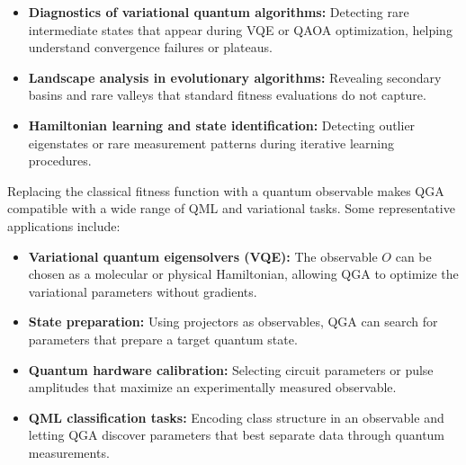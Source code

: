 \documentclass{article}
\begin{document}
\begin{itemize}
    \item \textbf{Diagnostics of variational quantum algorithms:}
    Detecting rare intermediate states that appear during VQE or QAOA optimization, helping understand convergence failures or plateaus.

    \item \textbf{Landscape analysis in evolutionary algorithms:} Revealing secondary basins and rare valleys that standard fitness
    evaluations do not capture.

    \item \textbf{Hamiltonian learning and state identification:} Detecting outlier eigenstates or rare measurement patterns during iterative learning procedures.
\end{itemize}

Replacing the classical fitness function with a quantum observable makes QGA compatible with a wide range of QML and variational tasks. Some representative applications include:

\begin{itemize}
    \item \textbf{Variational quantum eigensolvers (VQE):}
    The observable $O$ can be chosen as a molecular or physical Hamiltonian, allowing QGA to optimize the variational parameters without gradients.

    \item \textbf{State preparation:}
    Using projectors as observables, QGA can search for parameters that prepare a target quantum state.

    \item \textbf{Quantum hardware calibration:}
    Selecting circuit parameters or pulse amplitudes that maximize an experimentally measured observable.

    \item \textbf{QML classification tasks:}
    Encoding class structure in an observable and letting QGA discover parameters that best separate data through quantum measurements.
\end{itemize}
\end{document}
